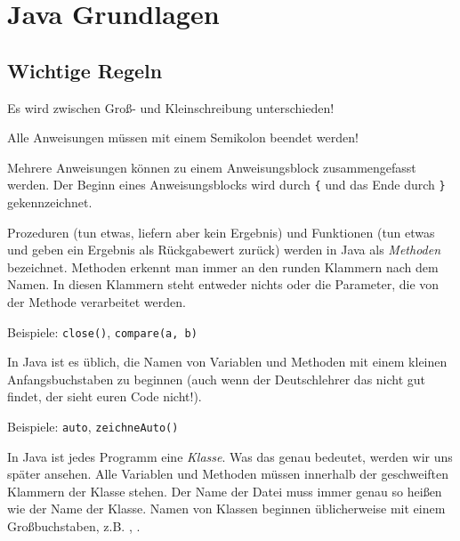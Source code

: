 \chapter{Java Grundlagen}
\renewcommand{\chaptertitle}{Java Grundlagen}

\lehead[]{\normalfont\sffamily\hspace*{-2.00cm}\textcolor{white}{\colorbox{lightblue}{\makebox[1.60cm][r]{\thechapter}}}\hspace{0.17cm}\textcolor{lightblue}{\chaptertitle}}
\rohead[]{\textcolor{lightblue}{\chaptertitle}\normalfont\sffamily\hspace*{0.17cm}\textcolor{white}{\colorbox{lightblue}{\makebox[1.60cm][l]{\thechapter}}}\hspace{-2.00cm}}
\rehead[]{\textcolor{lightblue}{AvHG, Inf, My}}
\lohead[]{\textcolor{lightblue}{AvHG, Inf, My}}

\lstset{style=myJava}


\section{Wichtige Regeln}

\begin{compactitem}
\item Es wird zwischen Groß- und Kleinschreibung unterschieden!

\item Alle Anweisungen müssen mit einem Semikolon beendet werden!

\item Mehrere Anweisungen können zu einem Anweisungsblock zusammengefasst
werden. Der Beginn eines Anweisungsblocks wird durch \lstinline|{| und das Ende
durch \lstinline|}| gekennzeichnet.

\item Prozeduren (tun etwas, liefern aber kein Ergebnis) und Funktionen (tun
etwas und geben ein Ergebnis als Rückgabewert zurück) werden in Java als
\emph{Methoden} bezeichnet. Methoden erkennt man immer an den runden Klammern
nach dem Namen. In diesen Klammern steht entweder nichts oder die Parameter, die
von der Methode verarbeitet werden.

Beispiele: \lstinline|close()|, \lstinline|compare(a, b)|

\item In Java ist es üblich, die Namen von Variablen und Methoden mit einem
kleinen Anfangsbuchstaben zu beginnen (auch wenn der Deutschlehrer das nicht
gut findet, der sieht euren Code nicht!).

Beispiele: \lstinline|auto|, \lstinline|zeichneAuto()|

\item In Java ist jedes Programm eine \emph{Klasse}. Was das genau bedeutet,
werden wir uns später ansehen. Alle Variablen und Methoden müssen innerhalb der
geschweiften Klammern der Klasse stehen. Der Name der Datei muss immer genau so
heißen wie der Name der Klasse. Namen von Klassen beginnen üblicherweise mit
einem Großbuchstaben, z.B. , .
\end{compactitem}


